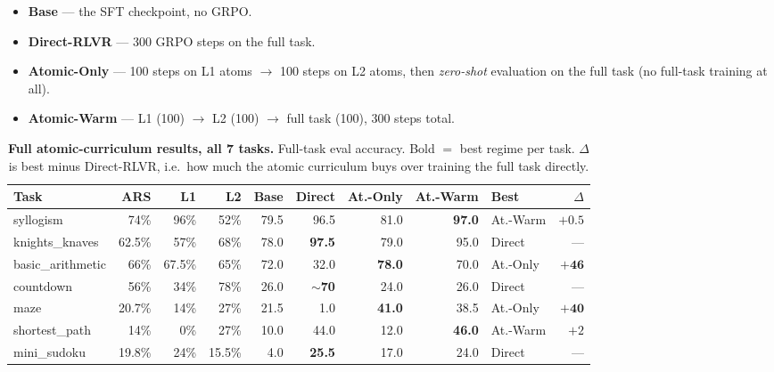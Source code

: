 \documentclass{article}
\begin{document}
\begin{itemize}\itemsep2pt
\item \textbf{Base} --- the SFT checkpoint, no GRPO.
\item \textbf{Direct-RLVR} --- 300 GRPO steps on the full task.
\item \textbf{Atomic-Only} --- 100 steps on L1 atoms $\rightarrow$ 100 steps on L2 atoms, then
\emph{zero-shot} evaluation on the full task (no full-task training at all).
\item \textbf{Atomic-Warm} --- L1 (100) $\rightarrow$ L2 (100) $\rightarrow$ full task (100),
300 steps total.
\end{itemize}

\begin{table}[h]
\centering\small
\caption{\textbf{Full atomic-curriculum results, all 7 tasks.} Full-task eval accuracy.
Bold $=$ best regime per task. $\Delta$ is best minus Direct-RLVR, i.e.\ how much the atomic
curriculum buys over training the full task directly.}
\label{tab:atomic-full}
\begin{tabular}{lrrrrrrrlr}
\toprule
Task & ARS & L1 & L2 & Base & Direct & At.-Only & At.-Warm & Best & $\Delta$\\
\midrule
syllogism        & 74\%   & 96\%   & 52\%   & 79.5 & 96.5 & 81.0 & \textbf{97.0} & At.-Warm & $+0.5$\\
knights\_knaves  & 62.5\% & 57\%   & 68\%   & 78.0 & \textbf{97.5} & 79.0 & 95.0 & Direct & ---\\
basic\_arithmetic& 66\%   & 67.5\% & 65\%   & 72.0 & 32.0 & \textbf{78.0} & 70.0 & At.-Only & $\mathbf{+46}$\\
countdown        & 56\%   & 34\%   & 78\%   & 26.0 & \textbf{$\sim$70} & 24.0 & 26.0 & Direct & ---\\
maze             & 20.7\% & 14\%   & 27\%   & 21.5 & 1.0  & \textbf{41.0} & 38.5 & At.-Only & $\mathbf{+40}$\\
shortest\_path   & 14\%   & 0\%    & 27\%   & 10.0 & 44.0 & 12.0 & \textbf{46.0} & At.-Warm & $+2$\\
mini\_sudoku     & 19.8\% & 24\%   & 15.5\% & 4.0  & \textbf{25.5} & 17.0 & 24.0 & Direct & ---\\
\bottomrule
\end{tabular}
\end{table}
\end{document}
